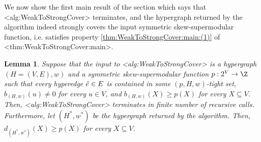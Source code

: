 \documentclass{article}
\def\Cref#1{<#1>}%
\newtheorem{lemma}{Lemma}[section]
\begin{document}
We now show the first main result of the section which says that \Cref{alg:WeakToStrongCover} terminates, and the hypergraph returned by the algorithm indeed strongly covers the input symmetric skew-supermodular function, i.e. satisfies property \ref{thm:WeakToStrongCover:main:(1)} of \Cref{thm:WeakToStrongCover:main}.

\begin{lemma}\label{lem:weak-to-strong:correctness:main:strong-cover}
    Suppose that the input to \Cref{alg:WeakToStrongCover} is a  hypergraph $(H = (V, E), w)$ and a symmetric skew-supermodular function $p:2^V\rightarrow \Z$ %
such that every hyperedge $\Tilde{e} \in E$ is contained in some $(p, H, w)$-tight set, $b_{(H,w)}(u) \not = 0$ for every $u \in V$, and $b_{(H,w)}(X) \geq p(X)$ for every $X \subseteq V$.  Then, \Cref{alg:WeakToStrongCover} terminates in finite number of recursive calls. Furthermore, let $(H^*, w^*)$ be the hypergraph returned by the algorithm. Then, $d_{(H^*, w^*)}(X) \geq p(X)$ for every $X\subseteq V$.
\end{lemma}
\end{document}
